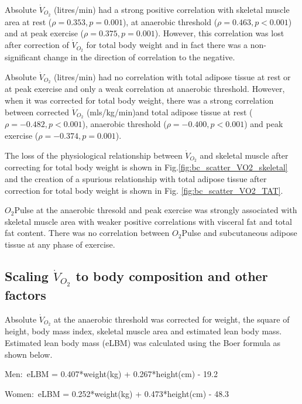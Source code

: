 Absolute $\dot{V}_{O_2}$ (litres/min) had a strong positive correlation with skeletal muscle area at rest ($\rho = 0.353, p = 0.001$), at anaerobic threshold ($\rho = 0.463, p<0.001$) and at peak exercise ($\rho = 0.375, p = 0.001$). 
However, this correlation was lost after correction of $\dot{V}_{O_2}$ for total body weight and in fact there was a non-significant change in the direction of correlation to the negative.

Absolute $\dot{V}_{O_2}$ (litres/min) had no correlation with total adipose tissue at rest or at peak exercise and only a weak correlation at anaerobic threshold. 
However, when it was corrected for total body weight, there was a strong correlation between corrected $\dot{V}_{O_2}$ (mls/kg/min)and total adipose tissue at rest ($\rho = -0.482, p<0.001$), anaerobic threshold ($\rho = -0.400, p<0.001$) and peak exercise ($\rho = -0.374, p = 0.001$).

The loss of the physiological relationship between $\dot{V}_{O_2}$ and skeletal muscle after correcting for total body weight is shown in Fig.\ref{fig:bc_scatter_VO2_skeletal} and the creation of a spurious relationship with total adipose tissue after correction for total body weight is shown in Fig. \ref{fig:bc_scatter_VO2_TAT}.

$O_2$Pulse at the anaerobic thresold and peak exercise was strongly associated with skeletal muscle area with weaker positive correlations with visceral fat and total fat content. 
There was no correlation between $O_2$Pulse and subcutaneous adipose tissue at any phase of exercise.


\subsection{Scaling $\dot{V}_{O_2}$ to body composition and other factors}


Absolute $\dot{V}_{O_2}$ at the anaerobic threshold was corrected for weight, the square of height, body mass index, skeletal muscle area and estimated lean body mass. 
Estimated lean body mass (eLBM) was calculated using the Boer formula \parencite{boer_estimated_1984} as shown below.

Men:\ eLBM = 0.407*weight(kg) + 0.267*height(cm) - 19.2

Women:\ eLBM = 0.252*weight(kg) + 0.473*height(cm) - 48.3

